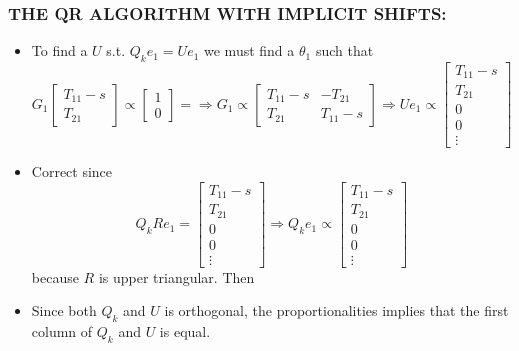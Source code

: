 \documentclass[a4paper,8pt]{beamer} %
\newcommand{\smatrix}[1]{\left[\begin{matrix} #1 \end{matrix}\right]}
\begin{document}
\begin{frame}  %
\frametitle{THE QR ALGORITHM WITH IMPLICIT SHIFTS:}
	\begin{itemize}
		\item
			To find a $U$ s.t. $Q_ke_1=Ue_1$ we must find a $\theta_1$ such that
			\begin{equation}
				G_1 
				\smatrix{ T_{11}-s \\ T_{21} } \propto \smatrix{ 1 \\ 0} = 
				\Rightarrow
				G_1 \propto  \smatrix{T_{11}-s & -T_{21} \\ T_{21} & T_{11}-s}
				\Rightarrow
				Ue_1 \propto \smatrix{T_{11}-s\\T_{21} \\0\\0\\ \vdots}
			\end{equation}
		\item
			Correct since
			\begin{equation}
				Q_kRe_1 = \smatrix{T_{11}-s\\T_{21}\\0\\0\\ \vdots} 
				\Rightarrow Q_ke_1 \propto  \smatrix{T_{11}-s\\T_{21} \\0\\0\\ \vdots}
			\end{equation}
			because $R$ is upper triangular. Then
		\item
			Since both $Q_k$ and $U$ is orthogonal, the proportionalities implies that 
			the first column of $Q_k$ and $U$ is equal.
	\end{itemize}
\end{frame}%
\end{document}
